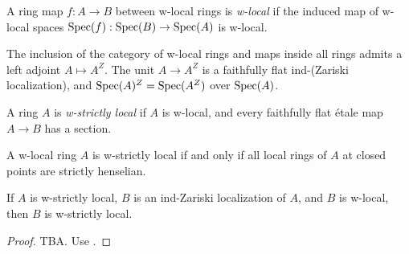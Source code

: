 \begin{definition}
    A ring map \(f: A \to B\) between w-local rings is \emph{w-local} if the induced map of w-local spaces \(\operatorname{Spec}(f) : \operatorname{Spec}(B) \to \operatorname{Spec}(A)\) is w-local.
    \label{def:w-local-ring-map}
\end{definition}

\begin{definition}
    \label{def:w-localization-ring}
    The inclusion of the category of w-local rings and maps inside all rings admits a left adjoint $A \mapsto A^Z$. The unit $A \to A^Z$ is a faithfully flat ind-(Zariski localization), and $\operatorname{Spec}(A)^Z = \operatorname{Spec}(A^Z)$ over $\operatorname{Spec}(A)$.
\end{definition}

\begin{definition}
    A ring \(A\) is \emph{w-strictly local} if \(A\) is w-local, and every faithfully flat \'etale map \(A \to B\) has a section.
    \label{def:w-strictly-local-ring}
    \leanok
\end{definition}

\begin{lemma}
    \label{lem:w-strictly-local-closed-points}

    A w-local ring $A$ is w-strictly local if and only if all local rings of $A$ at closed points are strictly henselian.
\end{lemma}

\begin{lemma}
    \label{lem:w-strictly-local-ind-Zariski-localization}
    If $A$ is w-strictly local, $B$ is an ind-Zariski localization of $A$, and $B$ is w-local, then $B$ is w-strictly local.
\end{lemma}

\begin{proof}

    TBA. Use .
\end{proof}

